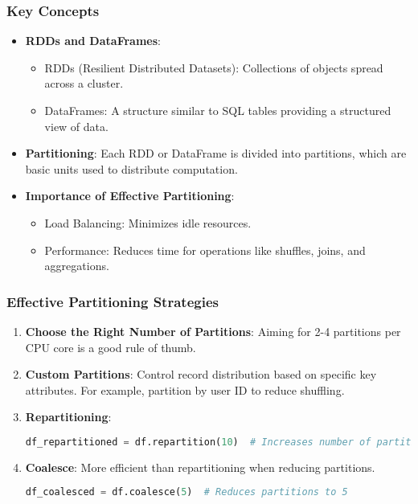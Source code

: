 \documentclass[aspectratio=169]{beamer}
\begin{document}
\begin{frame}[fragile]
    \frametitle{Key Concepts}
    \begin{itemize}
        \item \textbf{RDDs and DataFrames}:
        \begin{itemize}
            \item RDDs (Resilient Distributed Datasets): Collections of objects spread across a cluster.
            \item DataFrames: A structure similar to SQL tables providing a structured view of data.
        \end{itemize}
        
        \item \textbf{Partitioning}:
        Each RDD or DataFrame is divided into partitions, which are basic units used to distribute computation.
        
        \item \textbf{Importance of Effective Partitioning}:
        \begin{itemize}
            \item Load Balancing: Minimizes idle resources.
            \item Performance: Reduces time for operations like shuffles, joins, and aggregations.
        \end{itemize}
    \end{itemize}
\end{frame}

\begin{frame}[fragile]
    \frametitle{Effective Partitioning Strategies}
    \begin{enumerate}
        \item \textbf{Choose the Right Number of Partitions}:
        Aiming for 2-4 partitions per CPU core is a good rule of thumb.
        
        \item \textbf{Custom Partitions}:
        Control record distribution based on specific key attributes. For example, partition by user ID to reduce shuffling.
        
        \item \textbf{Repartitioning}:
        \begin{lstlisting}[language=Python]
df_repartitioned = df.repartition(10)  # Increases number of partitions to 10
        \end{lstlisting}
        
        \item \textbf{Coalesce}:
        More efficient than repartitioning when reducing partitions.
        \begin{lstlisting}[language=Python]
df_coalesced = df.coalesce(5)  # Reduces partitions to 5
        \end{lstlisting}
    \end{enumerate}
\end{frame}
\end{document}
